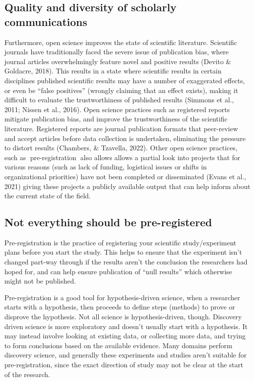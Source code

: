 \documentclass[
  letterpaper,
  DIV=11,
  numbers=noendperiod]{scrreport}
\begin{document}
\hypertarget{quality-and-diversity-of-scholarly-communications}{%
\subsection{Quality and diversity of scholarly
communications}\label{quality-and-diversity-of-scholarly-communications}}

Furthermore, open science improves the state of scientific literature.
Scientific journals have traditionally faced the severe issue of
publication bias, where journal articles overwhelmingly feature novel
and positive results (Devito \& Goldacre, 2018). This results in a state
where scientific results in certain disciplines published scientific
results may have a number of exaggerated effects, or even be ``false
positives'' (wrongly claiming that an effect exists), making it
difficult to evaluate the trustworthiness of published results (Simmons
et al., 2011; Nissen et al., 2016). Open science practices such as
registered reports mitigate publication bias, and improve the
trustworthiness of the scientific literature. Registered reports are
journal publication formats that peer-review and accept articles before
data collection is undertaken, eliminating the pressure to distort
results (Chambers, \& Tzavella, 2022). Other open science practices,
such as 📖pre-registration📖 also allows allows a partial look into
projects that for various reasons (such as lack of funding, logistical
issues or shifts in organizational priorities) have not been completed
or disseminated (Evans et al., 2021) giving these projects a publicly
available output that can help inform about the current state of the
field.

\hypertarget{not-everything-should-be-pre-registered}{%
\subsection{Not everything should be
pre-registered}\label{not-everything-should-be-pre-registered}}

Pre-registration is the practice of registering your scientific
study/experiment plans before you start the study. This helps to ensure
that the experiment isn't changed part-way through if the results aren't
the conclusion the researchers had hoped for, and can help ensure
publication of ``null results'' which otherwise might not be published.

Pre-registration is a good tool for hypothesis-driven science, when a
researcher starts with a hypothesis, then proceeds to define steps
(methods) to prove or disprove the hypothesis. Not all science is
hypothesis-driven, though. Discovery driven science is more exploratory
and doesn't usually start with a hypothesis. It may instead involve
looking at existing data, or collecting more data, and trying to form
conclusions based on the available evidence. Many domains perform
discovery science, and generally these experiments and studies aren't
suitable for pre-registration, since the exact direction of study may
not be clear at the start of the research.
\end{document}
